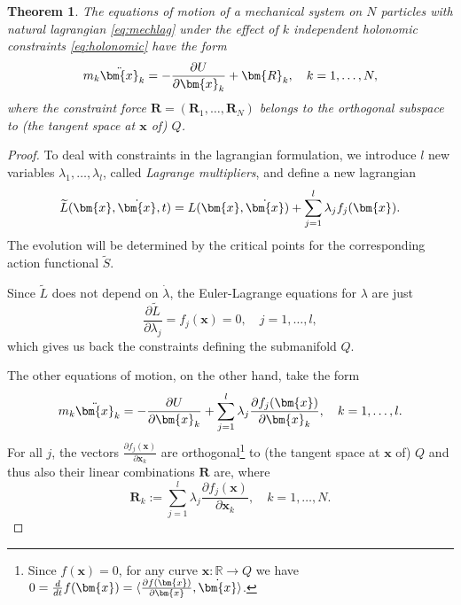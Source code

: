 \documentclass[english,fontsize=11pt,paper=a5,oneside]{scrbook}
\newcommand{\R}{\mathbb{R}}
\newcommand{\bx}{\bm{x}}
\newcommand{\lag}{\langle}
\newcommand{\rag}{\rangle}
\newtheorem{theorem}{Theorem}[chapter]
\theoremstyle{definition}
\begin{document}
\begin{theorem}
    The equations of motion of a mechanical system on $N$ particles with natural lagrangian \eqref{eq:mechlag} under the effect of $k$ independent holonomic constraints \eqref{eq:holonomic} have the form
    \begin{equation}\label{eq:generalnewtonconstraint}
        m_k \ddot \bx_k = - \frac{\partial U}{\partial \bx_k} + \bm{R}_k, \quad k=1, \ldots, N,
    \end{equation}
    where the \emph{constraint force} $\bm{R} = (\bm{R}_1, \ldots, \bm{R}_N)$ belongs to the orthogonal subspace to (the tangent space at $\bx$ of) $Q$.
\end{theorem}
\begin{proof}
    To deal with constraints in the lagrangian formulation, we introduce $l$ new variables $\lambda_1, \ldots, \lambda_l$, called \emph{Lagrange multipliers}, and define a new lagrangian
    \begin{equation}
        \widetilde L(\bx, \dot\bx, t) = L(\bx, \dot\bx) + \sum_{j=1}^l \lambda_j f_j(\bx).
    \end{equation}
    The evolution will be determined by the critical points for the corresponding action functional $\widetilde S$.

    Since $\widetilde L$ does not depend on $\dot\lambda$, the Euler-Lagrange equations for $\lambda$ are just
    \begin{equation}
        \frac{\partial \widetilde L}{\partial \lambda_j} = f_j(\bx) = 0,\quad j=1,\ldots,l,
    \end{equation}
    which gives us back the constraints defining the submanifold $Q$.

    The other equations of motion, on the other hand, take the form
    \begin{equation}\label{eq:newtconstr}
        m_k \ddot \bx_k = -\frac{\partial U}{\partial\bx_k} + \sum_{j=1}^l \lambda_j \frac{\partial f_j(\bx)}{\partial \bx_k},
        \quad k=1,\ldots,l.
    \end{equation}
    For all $j$, the vectors $\frac{\partial f_j(\bx)}{\partial \bx_k}$ are orthogonal\footnote{Since $f(\bx) = 0$, for any curve $\bx:\R\to Q$ we have $0 = \frac{d}{dt} f(\bx) = \lag \frac{\partial f(\bx)}{\partial \bx}, \dot\bx \rag$.} to (the tangent space at $\bx$ of) $Q$ and thus also their linear combinations $\bm{R}$ are, where 
    \begin{equation}
        \bm{R}_k := \sum_{j=1}^l \lambda_j \frac{\partial f_j(\bx)}{\partial \bx_k},
        \quad k=1,\ldots,N.
    \end{equation}
\end{proof}
\end{document}
